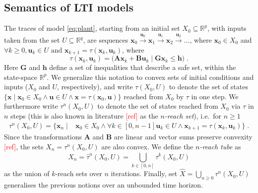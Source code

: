 \documentclass[sigconf]{llncs}
\newcommand{\mat}[1]{\boldsymbol{#1}}
\renewcommand{\vec}[1]{\boldsymbol{#1}}
\renewcommand{\note}[1]{\textcolor{red}{[#1]}}
\begin{document}
\subsection{Semantics of LTI models}\label{sec:model_semantics}
%
The traces of model \eqref{eq:plant}, 
starting from an initial set $X_0\subseteq \mathbb{R}^p$, 
with inputs taken from the set $U \subseteq \mathbb{R}^q$, are sequences 
$ \vec{x}_0 \xrightarrow{\vec{u}_0} \vec{x}_1 \xrightarrow{\vec{u}_1} \vec{x}_2 \xrightarrow{\vec{u}_2} \ldots $, 
%
where $ \vec{x}_0 \in X_0$ and $\forall k\geq 0, \vec{u}_k \in U \text{ and } \vec{x}_{k+1} = \tau(\vec{x}_k,\vec{u}_k) $, 
where 
%
\begin{equation}\label{equ:reachtraj}
\tau(\vec{x}_k,\vec{u}_k) = 
\big( \mat{A}\vec{x}_k +
\mat{B}\vec{u}_k \mid \mat{G}\vec{x}_k \leq \vec{h}\big)\;. 
\end{equation}
%
Here $\mat{G}$ and $\vec{h}$ define a set of inequalities that describe a safe set, within the state-space $\mathbb{R}^p$.
%
We generalize this notation to convex sets of initial conditions and inputs ($X_0$ and $U$, respectively), 
and write $\tau(X_0,U)$ to denote the set of states $\{\vec{x} \mid \vec{x}_0 \in
X_0 \wedge \vec{u} \in U \wedge \vec{x} = \tau(\vec{x}_0,\vec{u})\}$
reached from $X_0$ by $\tau$ in one step. 
%
We furthermore write $\tau^n(X_0,U)$ to denote the set of states reached from
$X_0$ via $\tau$ in $n$ steps (this is also known in literature \note{ref} as the \emph{$n$-reach set}), i.e.\ for $n\geq 1$
%
\begin{align}\label{equ:reachset}
\tau^n(X_0,U) = \{\vec{x}_n \mid &\vec{x}_0 \in X_0 \wedge \forall k\in [0,n-1]
\vec{u}_{k} \in U \wedge \vec{x}_{k+1}=\tau(\vec{x}_{k},\vec{u}_{k}) \} \;. 
\end{align}
%
Since the transformations $\mat{A}$ and $\mat{B}$ are linear and vector sums preserve convexity \note{ref}, 
the sets $X_n = \tau^n(X_0,U)$ are also convex.  
We define the \emph{$n$-reach tube} as 
\begin{equation}\label{equ:reachtube}
\hat{X}_n=\hat{\tau}^n(X_0,U)=\bigcup_{k\in[0,n]} \tau^k(X_0,U)
\end{equation}
as the union of $k$-reach sets over $n$ iterations. 
%
Finally, set $\hat{X} =\bigcup_{n\geq 0} \tau^n(X_0,U)$ 
generalises the previous notions over an unbounded time horizon.

\end{document}
